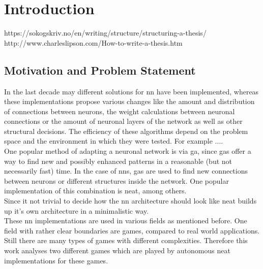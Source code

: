 %
\chapter{Introduction}
\label{sec:intro}



https://sokogskriv.no/en/writing/structure/structuring-a-thesis/
http://www.charleslipson.com/How-to-write-a-thesis.htm

\section{Motivation and Problem Statement}
\label{sec:intro:motivation}
In the last decade may different solutions for \gls{nn} have been implemented, whereas these implementations propose various changes like the amount and distribution of connections between neurons, the weight calculations between neuronal connections or the amount of neuronal layers  of the network as well as other structural decisions. 
The efficiency of these algorithms depend on the problem space and the environment in which they were tested. For example ....\\
One popular method of adapting a neuronal network is via \gls{ga}, since \gls{ga}s offer a way to find new and possibly enhanced patterns in a reasonable (but not necessarily fast) time. In the case of \gls{nn}s, \gls{ga}s are used to find new connections between neurons or different structures inside the network. One popular implementation of this combination is \gls{neat}, among others.  \\
Since it not trivial to decide how the \gls{nn} architecture should look like \gls{neat} builds up it's own architecture in a minimalistic way.\\
These \gls{nn} implementations are used in various fields as mentioned before. One field with rather clear boundaries are games, compared to real world applications. Still there are many types of games with different complexities. Therefore this work analyses two different games which are played by autonomous \gls{neat} implementations for these games.\\
